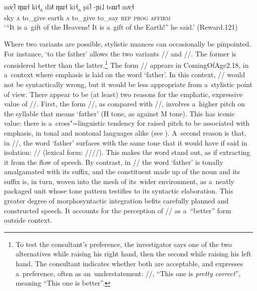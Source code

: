 \begin{exe}
	\ex
	\label{ex:reward121}
	\\
	\gll mv̩˥	ɳɯ˧		ki˧\textsubscript{a}		di˩˥	ɳɯ˧		ki˧\textsubscript{a}	pi˥		-ɲi˩		tsɯ˧˥	 mv̩˧\\
	sky		\textsc{a}	to\_give					earth	\textsc{a}	to\_give			to\_say			\textsc{rep}	\textsc{prog}	\textsc{affirm}\\
	\glt ‘“It is a~gift of the Heavens! It is a~gift of the Earth!” he said.’ (Reward.121)
\end{exe}

Where two variants are possible, stylistic nuances can occasionally be pinpointed. For instance, ‘to the father’ allows the two variants // and //. The former is considered better than the latter.\footnote{To test the
	consultant’s preference, the investigator says one of the two alternatives while raising his right
	hand, then the second while raising his left hand. The consultant indicates whether both are
	acceptable, and expresses a~preference, often as an~understatement: //, “This one is \textit{pretty correct}”, meaning “This one is better”.} The form // appears in ComingOfAge2.18, in a~context where emphasis is laid on the word ‘father’. In this context, // would not be syntactically wrong, but it would be less appropriate from a~stylistic point of view. There appear to be (at least) two reasons for the emphatic, expressive value of //. First, the form //, as compared with //, involves a~higher pitch on the syllable that means ‘father’ (H tone, as against M tone). This has iconic value: there is a~cross"=linguistic tendency for raised pitch to be associated with emphasis, in tonal and nontonal languages alike (see ). A~second reason is that, in //, the word ‘father’ surfaces with the same tone that it would have if said in isolation: // (lexical form: ////). This makes the word stand out, as if extracting it from the flow of speech. By contrast, in // the word ‘father’ is tonally amalgamated with its suffix, and the constituent made up of the noun and its suffix is, in turn, woven into the mesh of its~wider environment, as a~neatly packaged unit whose tone pattern testifies to its syntactic elaboration. This greater degree of morphosyntactic integration befits carefully planned and constructed speech. It accounts for the perception of // as a~“better” form outside context. 

